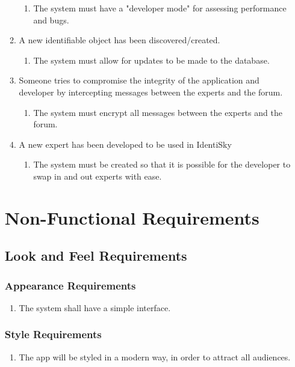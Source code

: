\documentclass[]{article}
\begin{document}
\begin{enumerate}[{VP}1.]
\begin{enumerate}[{BE2}.1]
\begin{enumerate}
			\item The system must have a "developer mode" for assessing performance and bugs.
		\end{enumerate}
		\item A new identifiable object has been discovered/created.
		\begin{enumerate}
			\item The system must allow for updates to be made to the database.
		\end{enumerate}
		\item Someone tries to compromise the integrity of the application and developer by intercepting messages between the experts and the forum.
		\begin{enumerate}
		    \item The system must encrypt all messages between the experts and the forum.
		\end{enumerate}
		\item A new expert has been developed to be used in IdentiSky
		\begin{enumerate}
			\item The system must be created so that it is possible for the developer to swap in and out experts with ease.
		\end {enumerate}
	\end{enumerate}


\section{Non-Functional Requirements}
\label{sec:non-functional_requirements}
\subsection{Look and Feel Requirements}
\label{sub:look_and_feel_requirements}

\subsubsection{Appearance Requirements}
\label{ssub:appearance_requirements}
\begin{enumerate}[{LF}1. ]
	\item The system shall have a simple interface.
\end{enumerate}

\subsubsection{Style Requirements}
\label{ssub:style_requirements}
\begin{enumerate}[{LF}1. ]
	\item The app will be styled in a modern way, in order to attract all audiences.
\end{enumerate}


\end{enumerate}
\end{document}
